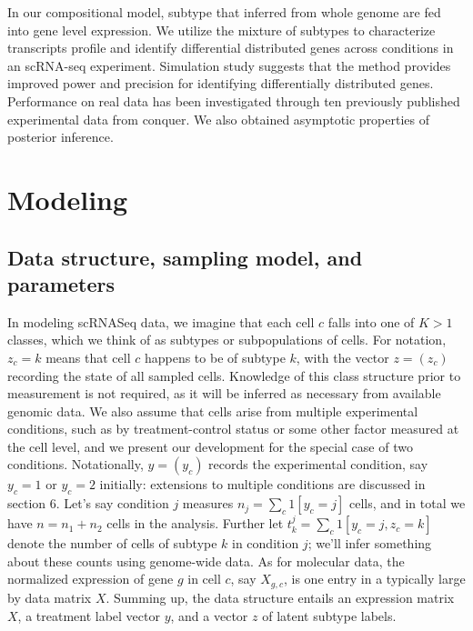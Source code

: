 \documentclass[11pt]{amsart}
\begin{document}
 
In our compositional model, subtype that inferred from whole genome are fed into gene level expression. 
We utilize the mixture of subtypes to characterize transcripts profile and identify differential distributed genes across conditions in an scRNA-seq experiment.
Simulation study suggests that the method provides improved power and precision for identifying differentially distributed genes. 
Performance on real data has been investigated through ten previously published experimental data from conquer\cite{ref:Cq}. 
We also obtained asymptotic properties of posterior inference. 

\section{Modeling}
\subsection{Data structure, sampling model, and parameters}
In modeling scRNASeq data, we
imagine that each cell $c$ falls into one of $K>1$ classes, which we think of as
subtypes or subpopulations of cells. For notation, $z_c=k$ means that cell $c$ happens to be of subtype $k$, with the vector $z=(z_c)$ recording
the state of all sampled cells.  Knowledge of this class structure
 prior to measurement is not required, as it will be inferred as necessary from
 available genomic data.   We also assume that cells arise from multiple
experimental conditions, such as by treatment-control status or some other factor
 measured at the cell level, and we present our development for the special
case of two conditions.  Notationally, $y=(y_c)$ records the experimental condition, say $y_c=1$ or $y_c=2$ initially:
extensions to multiple conditions are discussed in section 6. Let's say condition $j$ measures $n_j=\sum_{c} 1[y_c=j]$ cells,  and
in total we have $n=n_1+n_2$ cells in the analysis.  Further let $t^j_k = \sum_c 1[y_c=j, z_c=k]$ denote the number of cells of subtype $k$ in condition $j$;
we'll infer something about these counts using genome-wide data.  As for molecular data, the 
normalized expression of gene $g$ in cell $c$, say $X_{g,c}$, is one entry
in a typically large {} by {} data matrix $X$.  Summing up, the data structure entails an expression matrix
$X$, a treatment label vector $y$, and a vector $z$ of latent subtype labels.
\end{document}
